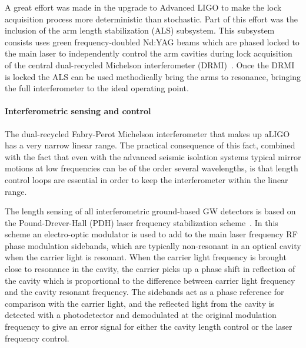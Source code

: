 A great effort was made in the upgrade to Advanced LIGO to make the lock acquisition process more deterministic than 
stochastic. Part of this effort was the inclusion of the arm length stabilization (ALS) subsystem. This subsystem consists uses 
green frequency-doubled Nd:YAG beams which are phased locked to the main laser to independently control the arm cavities during 
lock acquisition of the central dual-recycled Michelson interferometer (DRMI)~\cite{Staley2014}. Once the DRMI is locked the ALS can be used 
methodically bring the arms to resonance, bringing the full interferometer to the ideal operating point.

\paragraph*{Interferometric sensing and control}
The dual-recycled Fabry-Perot Michelson interferometer that makes up aLIGO has a very narrow linear range. 
The practical consequence of this fact, combined with the fact that even with the advanced seismic isolation systems typical 
mirror motions at low frequencies can be of the order several wavelengths, is that length control loops are essential in order 
to keep the interferometer within the linear range. 

The length sensing of all interferometric ground-based GW detectors is based on the Pound-Drever-Hall (PDH) laser 
frequency stabilization scheme~\cite{PDH}. 
In this scheme an electro-optic modulator is used to add to the main laser frequency RF phase modulation sidebands, 
which are typically non-resonant in an optical cavity when the carrier light is resonant.
When the carrier light frequency is brought close to resonance in the cavity, 
the carrier picks up a phase shift in reflection of the cavity which is proportional to the difference between carrier light 
frequency and the cavity resonant frequency. The sidebands act as a phase reference for comparison with the 
carrier light, and the reflected light 
from the cavity is detected with a photodetector and demodulated at the original modulation frequency to give an error 
signal for either the cavity length control or the laser frequency control. 

